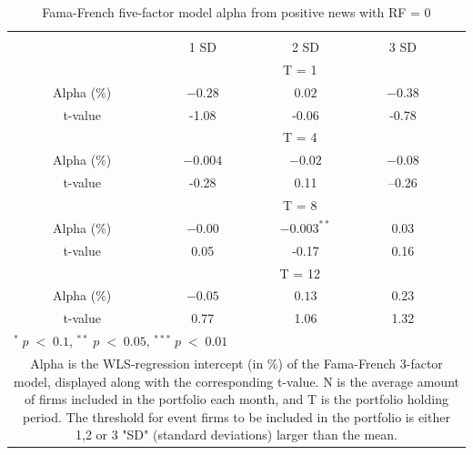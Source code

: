 \setlength{\tabcolsep}{15pt}
\begin{table}[]
\small
\centering
\caption{Fama-French five-factor model alpha from positive news with RF = 0} 
\begin{tabular}{ccccccc}
\hline \hline \\ 
 &     &  &    1 SD  &  2 SD  &  3 SD  &  \\ \cline{4-6} 
& & & \multicolumn{3}{c}{ T = 1} & \\ \cline{2-6}
& Alpha (\%)  &  & $-0.28$  & $0.02$  & $-0.38$ &  \\
& t-value &  & -1.08 & -0.06  & -0.78 & \\
& & & \multicolumn{3}{c}{ T = 4} & \\ \cline{2-6}
& Alpha (\%)  &  & $ -0.004$  & $-0.02$  &  $-0.08$ & \\
& t-value & & -0.28  & 0.11 & --0.26 & \\
& & & \multicolumn{3}{c}{ T = 8} & \\ \cline{2-6}
& Alpha (\%)  &  & $ -0.00$   & $-0.003^{**}$  & $0.03$ &  \\
& t-value &  & 0.05  & -0.17 & 0.16 & \\
&  & & \multicolumn{3}{c}{ T = 12} & \\ \cline{2-6}
& Alpha (\%)  &  & $ -0.05$  & $0.13$  & $0.23$ &  \\
& t-value &  & 0.77  & 1.06 & 1.32 & \\
\hline \hline
 \multicolumn{7}{l}{ \footnotesize $^* \; p\; <\; 0.1$, $ ^{**} \; p\; <\; 0.05$, $ ^{***} \; p\; <\; 0.01$  } \\
 \multicolumn{7}{p{11.5cm}}{ \footnotesize Alpha is the WLS-regression intercept (in \%) of the Fama-French 3-factor model, displayed along with the corresponding t-value. N is the average amount of firms included in the portfolio each month, and T is the portfolio holding period. The threshold for event firms to be included in the portfolio is either 1,2 or 3 "SD" (standard deviations) larger than the mean.}  \\ 
\end{tabular}
\label{tab: FF3-pos}
\end{table}

